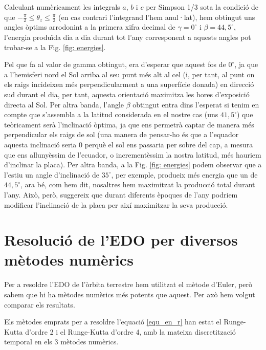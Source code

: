 \documentclass[11pt]{article}
\begin{document}
Calculant numèricament les integrals $a$, $b$ i $c$ per Simpson 1/3 sota la condició de que $-\frac{\pi}{2} \leq \theta_z \leq \frac{\pi}{2}$ (en cas contrari l'integrand l'hem anul·lat), hem obtingut uns angles òptims arrodonint a la primera xifra decimal de $\gamma=0^\circ$ i $\beta=44,5^\circ$, l'energia produïda dia a dia durant tot l'any corresponent a aquests angles pot trobar-se a la Fig. \ref{fig: energies}. 

Pel que fa al valor de gamma obtingut, era d'esperar que aquest fos de $0^\circ$, ja que a l'hemisferi nord el Sol arriba al seu punt més alt al cel (i, per tant, al punt on els raigs incideixen més perpendicularment a una superfície donada) en direcció sud durant el dia, per tant, aquesta orientació maximitza les hores d'exposició directa al Sol. Per altra banda, l'angle $\beta$ obtingut entra dins l'esperat si tenim en compte que s'assembla a la latitud considerada en el nostre cas (uns $41,5^\circ$) que teòricament serà l'inclinació òptima, ja que ens permetrà captar de manera més perpendicular els raigs de sol (una manera de pensar-ho és que a l'equador aquesta inclinació seria 0 perquè el sol ens passaria per sobre del cap, a mesura que ens allunyèssim de l'ecuador, o incrementèssim la nostra latitud, més hauriem d'inclinar la placa). Per altra banda, a la Fig. \ref{fig: energies} podem observar que a l'estiu un angle d'inclinació de $35^\circ$, per exemple, produeix més energia que un de $44,5^\circ$, ara bé, com hem dit, nosaltres hem maximitzat la producció total durant l'any. Això, però, suggereix que durant diferents èpoques de l'any podriem modificar l'inclinació de la placa per així maximitzar la seva producció.




\section{Resolució de l'EDO per diversos mètodes numèrics}\label{sec: edosRK}
Per a resoldre l'EDO de l'òrbita terrestre hem utilitzat el mètode d'Euler, però sabem que hi ha mètodes numèrics més potents que aquest. Per axò hem volgut comparar els resultats.

Els mètodes emprats per a resoldre l'equació \eqref{equ_en_r} han estat el Runge-Kutta d'ordre 2 i el Runge-Kutta d'ordre 4, amb la mateixa discretització temporal en els 3 mètodes numèrics.
\end{document}
